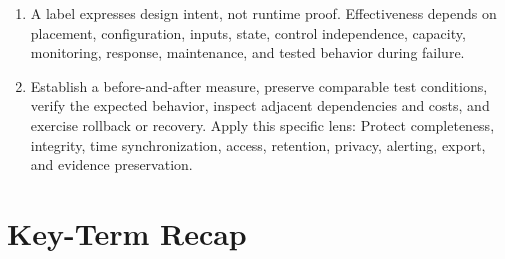 \documentclass[11pt]{article}
\begin{document}
\begin{enumerate}
\item A label expresses design intent, not runtime proof. Effectiveness depends on placement, configuration, inputs, state, control independence, capacity, monitoring, response, maintenance, and tested behavior during failure.
\item Establish a before-and-after measure, preserve comparable test conditions, verify the expected behavior, inspect adjacent dependencies and costs, and exercise rollback or recovery. Apply this specific lens: Protect completeness, integrity, time synchronization, access, retention, privacy, alerting, export, and evidence preservation.
\end{enumerate}
\section{Key-Term Recap}
\end{document}
